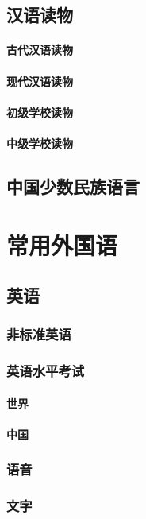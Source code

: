 \documentclass[UTF8]{../../RepresentationUniverse}
\begin{document}
\section{汉语读物}
    \subsubsection{古代汉语读物}
    \subsubsection{现代汉语读物}
    \subsubsection{初级学校读物}
    \subsubsection{中级学校读物}


\section{中国少数民族语言}




\chapter{常用外国语}
\section{英语}
    \subsection{非标准英语}
    \subsection{英语水平考试}
        \subsubsection{世界}
        \subsubsection{中国}
    \subsection{语音}
    \subsection{文字}
\end{document}
